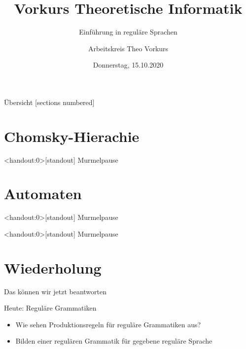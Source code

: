 

\title{Vorkurs Theoretische Informatik}
\subtitle{Einführung in reguläre Sprachen}
\date{Donnerstag, 15.10.2020}
\author{Arbeitskreis  Theo Vorkurs}



\maketitle

\begin{frame}[fragile]{Übersicht}
  [sections numbered]
  \tableofcontents%
\end{frame}


\section{Chomsky-Hierachie}



\begin{frame}<handout:0>[standout]
  Murmelpause
\end{frame}

\section{Automaten}



\begin{frame}<handout:0>[standout]
  Murmelpause
\end{frame}







\begin{frame}<handout:0>[standout]
  Murmelpause
\end{frame}

\section{Wiederholung}


\begin{frame}[fragile]{Das können wir jetzt beantworten}
	\begin{alertblock}{Heute: Reguläre Grammatiken}
		\begin{itemize}
			\item Wie sehen Produktionsregeln für reguläre Grammatiken aus?
			\item Bilden einer regulären Grammatik für gegebene reguläre Sprache
		\end{itemize}
	\end{alertblock}
\end{frame}

